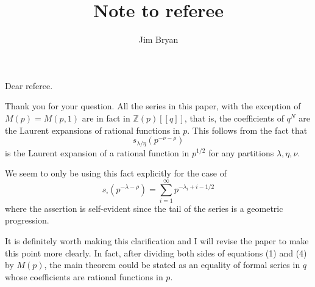 \documentclass{amsart}
\title{Note to referee}
\author{Jim Bryan}
\newcommand{\znums} {{\mathbb Z}}		%
\begin{document}
\maketitle 

Dear referee.

Thank you for your question. All the series in this paper, with the
exception of $M(p)=M(p,1)$ are in fact in $\znums (p)[[q]]$, that is,
the coefficients of $q^{N}$ are the Laurent expansions of rational
functions in $p$. This follows from the fact that 
\[
s_{\lambda /\eta}(p^{-\nu -\rho })
\]
is the Laurent expansion of a rational function in $p^{1/2}$ for any
partitions $\lambda , \eta , \nu$.

We seem to only be using this fact explicitly for the case of
\[
s_{\square}(p^{-\lambda -\rho }) = \sum_{i=1}^{\infty} p^{-\lambda_{i}+i
- 1/2}
\]
where the assertion is self-evident since the tail of the series is a
geometric progression.

It is definitely worth making this clarification and I will revise the
paper to make this point more clearly. In fact, after dividing both
sides of equations (1) and (4) by $M(p)$, the main theorem could be
stated as an equality of formal series in $q$ whose coefficients are
rational functions in $p$.


   
\end{document}
